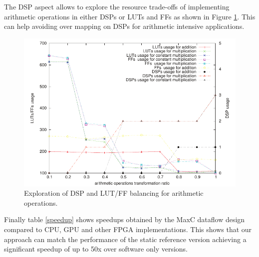The DSP aspect allows to explore the resource trade-offs of
implementing arithmetic operations in either DSPs or LUTs and FFs as
shown in Figure \ref{fig:arith}. This can help avoiding over mapping
on DSPs for arithmetic intensive applications.

\begin{figure}[!h]
\includegraphics[scale=0.7]{figs/arith}
\caption{Exploration of DSP and LUT/FF balancing for arithmetic
  operations.}
\label{fig:arith}
\end{figure}

Finally table \ref{speedup} shows speedups obtained by the MaxC
dataflow design compared to CPU, GPU and other FPGA
implementations. This shows that our approach can match the
performance of the static reference version achieving a significant
speedup of up to 50x over software only versions.

